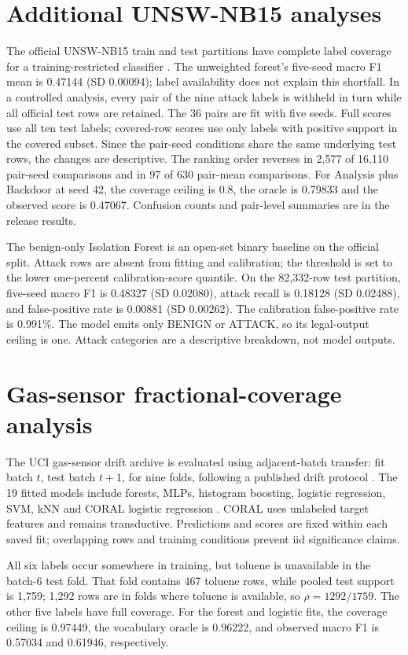 \documentclass{article}
\begin{document}
\section*{Additional UNSW-NB15 analyses}
The official UNSW-NB15 train and test partitions have complete label coverage for a training-restricted classifier \cite{moustafa2015}. The unweighted forest's five-seed macro F1 mean is 0.47144 (SD 0.00094); label availability does not explain this shortfall. In a controlled analysis, every pair of the nine attack labels is withheld in turn while all official test rows are retained. The 36 pairs are fit with five seeds. Full scores use all ten test labels; covered-row scores use only labels with positive support in the covered subset. Since the pair-seed conditions share the same underlying test rows, the changes are descriptive. The ranking order reverses in 2,577 of 16,110 pair-seed comparisons and in 97 of 630 pair-mean comparisons. For Analysis plus Backdoor at seed 42, the coverage ceiling is 0.8, the oracle is 0.79833 and the observed score is 0.47067. Confusion counts and pair-level summaries are in the release results.

The benign-only Isolation Forest is an open-set binary baseline on the official split. Attack rows are absent from fitting and calibration; the threshold is set to the lower one-percent calibration-score quantile. On the 82,332-row test partition, five-seed macro F1 is 0.48327 (SD 0.02080), attack recall is 0.18128 (SD 0.02488), and false-positive rate is 0.00881 (SD 0.00262). The calibration false-positive rate is 0.991\%. The model emits only BENIGN or ATTACK, so its legal-output ceiling is one. Attack categories are a descriptive breakdown, not model outputs.

\section*{Gas-sensor fractional-coverage analysis}
The UCI gas-sensor drift archive is evaluated using adjacent-batch transfer: fit batch \(t\), test batch \(t+1\), for nine folds, following a published drift protocol \cite{gasdata,gasprotocol}. The 19 fitted models include forests, MLPs, histogram boosting, logistic regression, SVM, kNN and CORAL logistic regression \cite{coral2016}. CORAL uses unlabeled target features and remains transductive. Predictions and scores are fixed within each saved fit; overlapping rows and training conditions prevent iid significance claims.

All six labels occur somewhere in training, but toluene is unavailable in the batch-6 test fold. That fold contains 467 toluene rows, while pooled test support is 1,759; 1,292 rows are in folds where toluene is available, so \(\rho=1292/1759\). The other five labels have full coverage. For the forest and logistic fits, the coverage ceiling is 0.97449, the vocabulary oracle is 0.96222, and observed macro F1 is 0.57034 and 0.61946, respectively.
\end{document}
